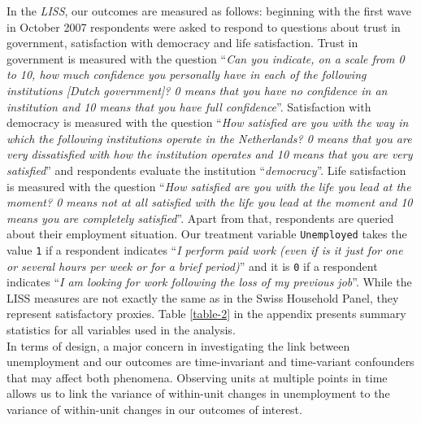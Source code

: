 \documentclass[12pt,]{article}
\begin{document}
In the \emph{LISS}, our outcomes are measured as follows: beginning with the first wave in October 2007 respondents were asked to respond to questions about trust in government, satisfaction with democracy and life satisfaction. Trust in government is measured with the question ``\emph{Can you indicate, on a scale from 0 to 10, how much confidence you personally have in each of the following institutions {[}Dutch government{]}? 0 means that you have no confidence in an institution and 10 means that you have full confidence}''. Satisfaction with democracy is measured with the question ``\emph{How satisfied are you with the way in which the following institutions operate in the Netherlands? 0 means that you are very dissatisfied with how the institution operates and 10 means that you are very satisfied}'' and respondents evaluate the institution ``\emph{democracy}''. Life satisfaction is measured with the question ``\emph{How satisfied are you with the life you lead at the moment? 0 means not at all satisfied with the life you lead at the moment and 10 means you are completely satisfied}''. Apart from that, respondents are queried about their employment situation. Our treatment variable \texttt{Unemployed} takes the value \texttt{1} if a respondent indicates ``\emph{I perform paid work (even if is it just for one or several hours per week or for a brief period)}'' and it is \texttt{0} if a respondent indicates ``\emph{I am looking for work following the loss of my previous job}''. While the LISS measures are not exactly the same as in the Swiss Household Panel, they represent satisfactory proxies. Table \ref{table-2} in the appendix presents summary statistics for all variables used in the analysis.\\
In terms of design, a major concern in investigating the link between unemployment and our outcomes are time-invariant and time-variant confounders that may affect both phenomena. Observing units at multiple points in time allows us to link the variance of within-unit changes in unemployment to the variance of within-unit changes in our outcomes of interest.\\
\end{document}
